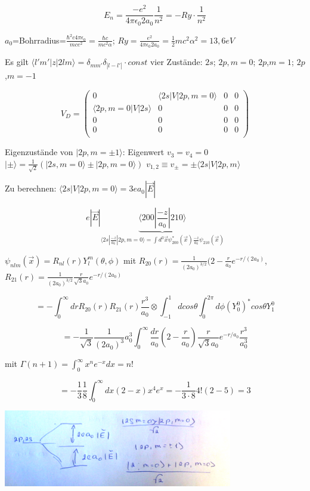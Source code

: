 \[ E_n = \frac{-e^2}{4\pi\epsilon_0 2a_0}\frac{1}{n^2}=-Ry\cdot \frac{1}{n^2}\]

\(a_0\)=Bohrradius=\(\frac{\hbar^2 c4\pi\epsilon_0}{mce^2}= \frac{\hbar c}{mc^2\alpha}\); \(Ry = \frac{e^2}{4\pi\epsilon_0 2a_0}=\frac{1}{2}mc^2 \alpha^2 = 13,6 eV\)


Es gilt \(\langle l'm'|z|2 l m\rangle = \delta_{mm'}\delta_{|l-l'|}\cdot const\) vier Zustände: \(2s\); \(2p,m=0\); \(2p\),\(m=1\); \(2p\),\(m=-1\)

\[ V_D = 
\begin{pmatrix} 0 & \langle 2s|V| 2p,m=0\rangle&0&0 \\
  \langle 2p,m=0|V| 2s\rangle&0&0&0\\
  0&0&0&0\\
  0&0&0&0\\
\end{pmatrix}
\]

Eigenzustände von \(|2p,m=\pm 1\rangle\): Eigenwert \(v_3=v_4=0\) \(|\pm\rangle=\frac{1}{\sqrt 2}(|2s,m=0\rangle \pm |2p,m=0\rangle)\) \(v_{1,2}\equiv v_{\pm}=\pm \langle 2s|V|2p,m\rangle\)

Zu berechnen: \(\langle 2s|V|2p,m=0\rangle= 3ea_0|\vec E|\)

\[e|\vec E| \underbrace{\langle 200|\frac{-z}{a_0}|210\rangle}_{\langle 2s|\frac{-z}{a_0}|2p,m=0\rangle=\int d^3\vec x \psi^*_{200}(\vec x)\frac{-z}{a_0}\psi_{210} (\vec x) }\]

\(\psi_{nlm}(\vec x) = R_{nl}(r) Y^m_l(\theta,\phi)\) mit \(R_{20}(r) = \frac{1}{(2a_0)^{3/2}}(2-\frac{r}{a_0}e^{-r/(2a_0)}\), \(R_{21}(r) = \frac{1}{(2a_0)^{3/2}}\frac{r}{\sqrt 3 a_0}e^{-r/(2a_0)}\)

\[ = -\int^\infty_0 dr R_{20}(r) R_{21}(r) \frac{r^3}{a_0}\otimes \int^1_{-1}dcos\theta\int^{2\pi}_0 d\phi (Y^0_0)^* cos\theta Y^0_1\]

\[ = -\frac{1}{\sqrt 3} \frac{1}{(2 a_0)^3} a^3_0 \int^\infty_0 \frac{dr}{a_0}(2-\frac{r}{a_0})\frac{r}{\sqrt 3 a_0}e^{-r/a_0}\frac{r^3}{a^3_0}\]

mit \(\Gamma (n+1) = \int^\infty_0 x^ne^{-x}dx=n!\)

\[ = -\frac{1}{3}\frac{1}{8}\int^\infty_0 dx (2-x)x^4e^x = -\frac{1}{3\cdot 8} 4!(2-5)=3\]


\includegraphics[width=0.75\textwidth]{kap03_01.png}


